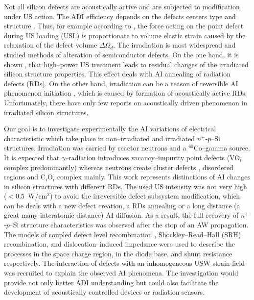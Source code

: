 \documentclass[aip,jap, amsmath,amssymb,reprint]{revtex4-1}
\begin{document}
Not all silicon defects are acoustically active and are subjected to modification under US action.
The ADI efficiency depends on the defects centers type and structure \cite{UST:Medvid}.
Thus, for example according to \cite{MirzadeJAP2011,PeleshchakUJF2016}, the force acting on the point defect during US loading (USL) is proportionate to volume elastic strain caused by the relaxation of the defect volume $\Delta\Omega_d$.
The irradiation is most widespread and studied methods of alteration of semiconductor defects.
On the one hand, it is shown \cite{YOlikh2007TPL,Parchinskii2006,Gorb2010,Podolian2012}, that high--power US treatment leads to residual changes of the irradiated silicon structure properties.
This effect deals with AI annealing of radiation defects (RDs).
On the other hand, irradiation can be a reason of reversible AI phenomenon initiation \cite{YOlikh2006TPL,YOlikhTPL2011}, which is caused by formation of acoustically active RDs.
Unfortunately, there have only few reports on acoustically driven phenomenon in irradiated silicon structures.


Our goal is to investigate experimentally the AI variations of electrical characteristic which take place in non--irradiated and irradiated $n^+$-$p$--Si structures.
Irradiation was carried by reactor neutrons and a $^{60}$Co--gamma source.
It is expected that $\gamma$--radiation introduces vacancy--impurity point defects (VO$_i$ complex predominantly) \cite{NIEL:Jafari,Gamma:Prabhakara,NIEL:Moll}
whereas neutrons create cluster defects \cite{Rew:Srour,Pintilie}, disordered regions \cite{Neutron:Arutyunov} and C$_i$O$_i$ complex  \cite{NIEL:Moll,neutron:Londos} mainly.
This work represents distinctions of AI changes in silicon structures with different RDs.
The used US intensity was not very high ($<0.5$~W/cm$^2$) to avoid the irreversible defect subsystem modification, which can be deals with a new defect creation, a RDs annealing or a long distance (a great many interatomic distance) AI diffusion.
As a result, the full recovery of $n^+$-$p$--Si structure characteristics was observed after the stop of an AW propagation.
The models of coupled defect level recombination \cite{CDLR:JAP1995,CDLR:JAP}, Shockley--Read--Hall (SRH) recombination, and dislocation--induced impedance \cite{Rsh:Gopal2003,Rsh:Gopal2004} were used to describe the processes in the space charge region,  in the diode base, and shunt resistance respectively.
The interaction of defects with an inhomogeneous USW strain field \cite{MirzadeJAP2011,PeleshchakUJF2016} was recruited to explain the observed AI phenomena.
The investigation would provide not only better ADI understanding but could also facilitate the development of acoustically controlled devices or radiation sensors.
\end{document}
